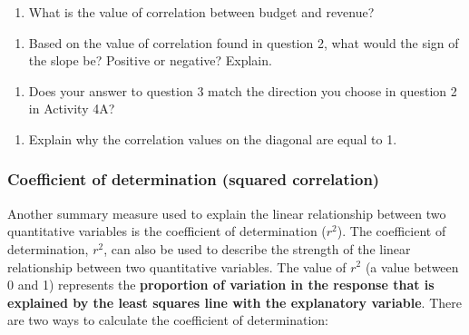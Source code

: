 \documentclass[
]{report}
\providecommand{\tightlist}{%
  \setlength{\itemsep}{0pt}\setlength{\parskip}{0pt}}
\begin{document}
\vspace{0.5in}

\begin{enumerate}
\def\labelenumi{\arabic{enumi}.}
\setcounter{enumi}{1}
\tightlist
\item
  What is the value of correlation between budget and revenue?
\end{enumerate}

\vspace{0.3in}

\begin{enumerate}
\def\labelenumi{\arabic{enumi}.}
\setcounter{enumi}{2}
\tightlist
\item
  Based on the value of correlation found in question 2, what would the sign of the slope be? Positive or negative? Explain.
\end{enumerate}

\vspace{0.5in}

\begin{enumerate}
\def\labelenumi{\arabic{enumi}.}
\setcounter{enumi}{3}
\tightlist
\item
  Does your answer to question 3 match the direction you choose in question 2 in Activity 4A?
\end{enumerate}

\vspace{0.3in}

\begin{enumerate}
\def\labelenumi{\arabic{enumi}.}
\setcounter{enumi}{4}
\tightlist
\item
  Explain why the correlation values on the diagonal are equal to 1.
\end{enumerate}

\vspace{0.8in}
\newpage

\hypertarget{coefficient-of-determination-squared-correlation}{%
\subsubsection*{Coefficient of determination (squared correlation)}\label{coefficient-of-determination-squared-correlation}}

Another summary measure used to explain the linear relationship between two quantitative variables is the coefficient of determination (\(r^2\)). The coefficient of determination, \(r^2\), can also be used to describe the strength of the linear relationship between two quantitative variables. The value of \(r^2\) (a value between 0 and 1) represents the \textbf{proportion of variation in the response that is explained by the least squares line with the explanatory variable}. There are two ways to calculate the coefficient of determination:
\end{document}
